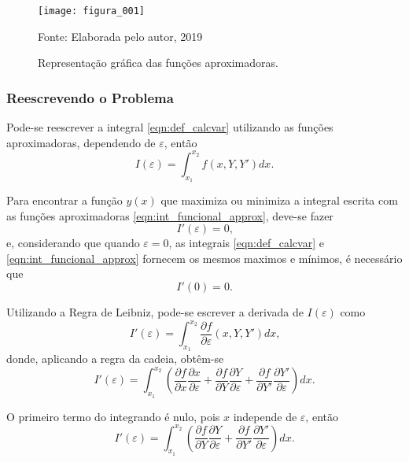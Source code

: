 \documentclass{beamer}
\begin{document}
{
	\usebackgroundtemplate{}
	\begin{frame}
		\begin{figure}
			\caption{Representação gráfica das funções aproximadoras.}
			\begin{center}
				\texttt{[image: figura\_001]}\par
				{\small Fonte: Elaborada pelo autor, 2019}
			\end{center}
			\label{fig:func_approx}
		\end{figure}
	\end{frame}
}
	
\begin{frame}
	\frametitle{Reescrevendo o Problema}
	\justify
	
	Pode-se reescrever a integral \eqref{eqn:def_calcvar} utilizando as funções aproximadoras, dependendo de $\varepsilon$, então
	\begin{equation}
		\label{eqn:int_funcional_approx}
		I(\varepsilon)=\int_{x_1}^{x_2}f(x, Y, Y')dx\text{.}
	\end{equation}
	
	Para encontrar a função $y(x)$ que maximiza ou minimiza a integral escrita com as funções aproximadoras \eqref{eqn:int_funcional_approx}, deve-se fazer
	$$I'(\varepsilon)=0\text{,}$$
	e, considerando que quando $\varepsilon=0$, as integrais \eqref{eqn:def_calcvar} e \eqref{eqn:int_funcional_approx} fornecem os mesmos maximos e mínimos, é necessário que
	$$I'(0)=0\text{.}$$
\end{frame}

\begin{frame}
	\justify
	
	Utilizando a Regra de Leibniz, pode-se escrever a derivada de $I(\varepsilon)$ como
	$$I'(\varepsilon)=\int_{x_1}^{x_2} \frac{\partial f}{\partial \varepsilon} (x, Y, Y') dx \text{,}$$
	\pause
	donde, aplicando a regra da cadeia, obtêm-se
	$$I'(\varepsilon)=\int_{x_1}^{x_2}\left ( \frac{\partial f}{\partial x}\frac{\partial x}{\partial \varepsilon} + \frac{\partial f}{\partial Y} \frac{\partial Y}{\partial \varepsilon} + \frac{\partial f}{\partial Y'} \frac{\partial Y'}{\partial \varepsilon} \right )dx\text{.}$$
	\pause
	
	O primeiro termo do integrando é nulo, pois $x$ independe de $\varepsilon$, então
	$$
		I'(\varepsilon)=\int_{x_1}^{x_2}\left ( \frac{\partial f}{\partial Y}\frac{\partial Y}{\partial \varepsilon} + \frac{\partial f}{\partial Y'}\frac{\partial Y'}{\partial \varepsilon} \right ) dx \text{.}
	$$
\end{frame}
\end{document}
